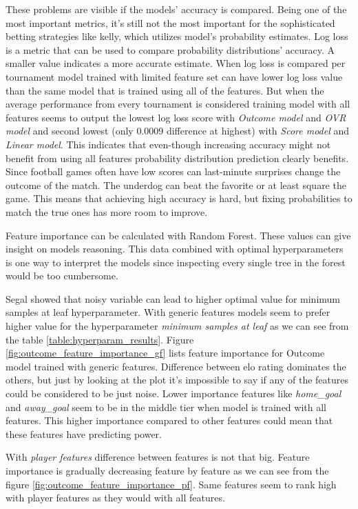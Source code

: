 These problems are visible if the models' accuracy is compared. Being one of the most important metrics, it's still not the most important for the sophisticated betting strategies like kelly, which utilizes model's probability estimates. Log loss is a metric that can be used to compare probability distributions' accuracy. A smaller value indicates a more accurate estimate. When log loss is compared per tournament model trained with limited feature set can have lower log loss value than the same model that is trained using all of the features. But when the average performance from every tournament is considered training model with all features seems to output the lowest log loss score with \textit{Outcome model} and \textit{OVR model} and second lowest (only 0.0009 difference at highest) with \textit{Score model} and \textit{Linear model}. This indicates that even-though increasing accuracy might not benefit from using all features probability distribution prediction clearly benefits. Since football games often have low scores can last-minute surprises change the outcome of the match. The underdog can beat the favorite or at least square the game. This means that achieving high accuracy is hard, but fixing probabilities to match the true ones has more room to improve.

Feature importance can be calculated with Random Forest. These values can give insight on models reasoning. This data combined with optimal hyperparameters is one way to interpret the models since inspecting every single tree in the forest would be too cumbersome.

Segal \cite{segal2004machine} showed that noisy variable can lead to higher optimal value for minimum samples at leaf hyperparameter. With generic features models seem to prefer higher value for the hyperparameter \textit{minimum samples at leaf} as we can see from the table \ref{table:hyperparam_results}.  Figure \ref{fig:outcome_feature_importance_gf} lists feature importance for Outcome model trained with generic features. Difference between elo rating dominates the others, but just by looking at the plot it's impossible to say if any of the features could be considered to be just noise. Lower importance features like \textit{home\_goal} and \textit{away\_goal} seem to be in the middle tier when model is trained with all features. This higher importance compared to other features could mean that these features have predicting power.

With \textit{player features} difference between features is not that big. Feature importance is gradually decreasing feature by feature as we can see from the figure \ref{fig:outcome_feature_importance_pf}. Same features seem to rank high with player features as they would with all features.

